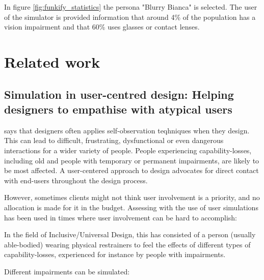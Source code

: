 In figure \ref{fig:funkify_statistics} the persona "Blurry Bianca" is selected. The user of the simulator is provided information that around 4\% of the population has a vision impairment and that 60\% uses glasses or contact lenses. 


\section{Related work}
\subsection{Simulation in user-centred design: Helping designers to empathise with atypical users}
\textcite{Cardoso2012} says that designers often applies self-observation teqhniques when they design. This can lead to difficult, frustrating, dysfunctional or even dangerous interactions for a wider variety of people. People experiencing capability-losses, including old and people with temporary or permanent impairments, are likely to be most affected. A user-centered approach to design advocates for direct contact with end-users throughout the design process. 

However, sometimes clients might not think user involvement is a priority, and no allocation is made for it in the budget. Assessing with the use of user simulations has been used in times where user involvement can be hard to accomplish: 
\begin{displayquote}
    In the field of Inclusive/Universal Design, this has consisted of a person (usually able-bodied) wearing physical restrainers to feel the effects of different types of capability-losses, experienced for instance by people with impairments.
\end{displayquote}

Different impairments can be simulated:
